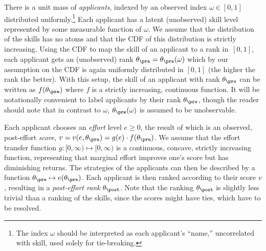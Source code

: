 \documentclass[10pt]{article}
\begin{document}
\begin{ReviewVerbatim}
There is a unit mass of \textit{applicants}, indexed by an observed index $\omega \in [0,1]$ distributed uniformly.\footnote{The index $\omega$ should be interpreted as each applicant's ``name,'' uncorrelated with skill, used solely for tie-breaking.}  Each applicant has a latent (unobserved) skill level represented by some measurable function of $\omega$.
We assume that {the distribution of the skills} has no atoms and that the CDF of this distribution is strictly increasing.
Using the CDF to map the skill of an applicant to a rank in~$[0,1]$, each applicant gets an (unobserved) rank $\theta_\pre =\theta_\pre(\omega)$ which by our assumption on the CDF is again uniformly distributed in $[0, 1]$ (the higher the rank the better).  With this setup, the skill of an applicant with rank $\theta_\pre$ can be written as $f(\theta_\pre)$ where $f$ is a strictly increasing, continuous function.  {It will be notationally convenient to label applicants by their rank $\theta_\pre$, though the reader should note that in contrast to $\omega$, $\theta_\pre(\omega)$ is assumed to be unobservable.}



Each applicant chooses an \textit{effort} level $e \ge 0$, the result of which is an observed, post-effort \textit{score}, {$v=v(e,\theta_\pre) = {g(e)}\cdot{f(\theta_\pre)}$}. 
{We assume} that the effort transfer function $g: [0, \infty) \mapsto [0, \infty)$ is a continuous, concave, strictly increasing function, representing that marginal effort improves one's score but has diminishing returns.
{%
{T}he strategies of the applicants can {then} be described by a function $\theta_\pre \mapsto e(\theta_\pre)$.
}
  Each {applicant} is then ranked according to their score $v$%
, resulting in a \textit{post-effort rank} $\theta_\post$.
Note that the ranking $\theta_\post$ is slightly less trivial than a ranking of the skills, since the scores might have ties, which have to be resolved.


\end{ReviewVerbatim}
\end{document}
